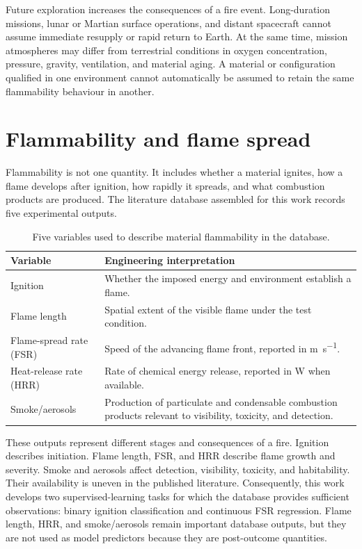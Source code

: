 Future exploration increases the consequences of a fire event. Long-duration
missions, lunar or Martian surface operations, and distant spacecraft cannot
assume immediate resupply or rapid return to Earth. At the same time, mission
atmospheres may differ from terrestrial conditions in oxygen concentration,
pressure, gravity, ventilation, and material aging. A material or configuration
qualified in one environment cannot automatically be assumed to retain the same
flammability behaviour in another.

\section{Flammability and flame spread}
\label{sec:intro-flammability}

Flammability is not one quantity. It includes whether a material ignites, how
a flame develops after ignition, how rapidly it spreads, and what combustion
products are produced. The literature database assembled for this work records
five experimental outputs.

\begin{table}[htbp]
\centering
\caption{Five variables used to describe material flammability in the database.}
\label{tab:flammability-variables}
\begin{tabularx}{\textwidth}{@{}p{}X@{}}
\toprule
Variable & Engineering interpretation \\
\midrule
Ignition & Whether the imposed energy and environment establish a flame. \\
Flame length & Spatial extent of the visible flame under the test condition. \\
Flame-spread rate (FSR) & Speed of the advancing flame front,
reported in \si{\metre\per\second}. \\
Heat-release rate (HRR) & Rate of chemical energy release,
reported in \si{\watt} when available. \\
Smoke/aerosols & Production of particulate and condensable combustion
products relevant to visibility, toxicity, and detection. \\
\bottomrule
\end{tabularx}
\end{table}

These outputs represent different stages and consequences of a fire. Ignition
describes initiation. Flame length, FSR, and HRR describe flame growth and
severity. Smoke and aerosols affect detection, visibility, toxicity, and
habitability. Their availability is uneven in the published literature.
Consequently, this work develops two supervised-learning tasks for which the
database provides sufficient observations: binary ignition classification and
continuous FSR regression. Flame length, HRR, and smoke/aerosols remain
important database outputs, but they are not used as model predictors because
they are post-outcome quantities.

